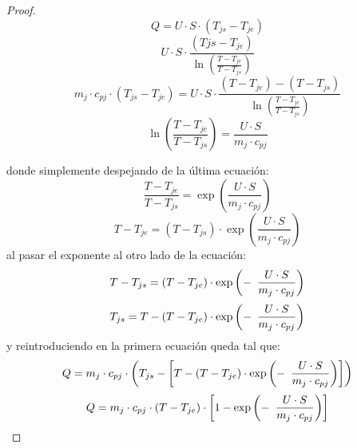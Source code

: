 \begin{proof}
  \begin{equation*}
    Q = U\cdot S \cdot (T_{js}-T_{je})
  \end{equation*}
  \begin{equation*}
    U \cdot S \cdot \frac{(T{js}-T_{je})}{\ln\left(\frac{T-T_{je}}{T-T_{js}}\right)}
  \end{equation*}
  \vspace{0.1cm}
  \begin{equation*}
    m_j \cdot c_{pj} \cdot (T_{js}-T_{je}) = U \cdot S \cdot \frac{(T-T_{je})-(T-T_{js})}{\ln\left(\frac{T-T_{je}}{T-T_{js}}\right)}
  \end{equation*}
  \begin{equation*}
    \ln \left(\frac{T-T_{je}}{T-T_{js}}\right) = \frac{U \cdot S }{m_j \cdot c_{pj}}
  \end{equation*}

  \noindent donde simplemente despejando de la última ecuación:
  \begin{equation*}
    \frac{T-T_{je}}{T-T_{js}} = \exp\left(\frac{U \cdot S }{m_j \cdot c_{pj}}\right)
  \end{equation*}
  \begin{equation*}
    T - T_{je} = (T-T_{js}) \cdot \exp\left(\frac{U \cdot S }{m_j \cdot c_{pj}}\right)
  \end{equation*}
  al pasar el exponente al otro lado de la ecuación:
  \begin{equation*}
    T-T_{js} = (T - T_{je}) \cdot \exp\left(- \hspace{0.5em}\frac{U \cdot S }{m_j \cdot c_{pj}}\right)
  \end{equation*}
  \begin{equation*}
    T_{js} = T- (T - T_{je}) \cdot \exp\left(- \hspace{0.5em}\frac{U \cdot S }{m_j \cdot c_{pj}}\right)
  \end{equation*}
  \noindent y reintroduciendo en la primera ecuación queda tal que:
  \begin{equation*}
    Q = m_j \cdot c_{pj} \cdot \left(T_{js} - \left[ T - (T - T_{je}) \cdot \exp\left(- \hspace{0.5em}\frac{U \cdot S }{m_j \cdot c_{pj}}\right) \right] \right)
  \end{equation*}
  \begin{equation*}
    Q = m_j \cdot c_{pj} \cdot (T - T_{je}) \cdot \left[1 - \exp\left(-\hspace{0.5em} \frac{U \cdot S}{m_j \cdot c_{pj}}\right)\right]
  \end{equation*}
\end{proof}
\newpage
